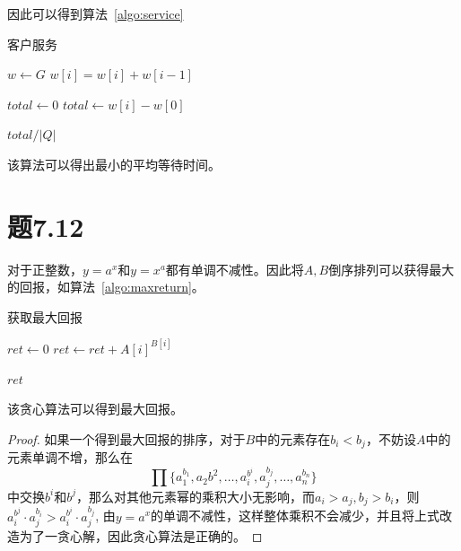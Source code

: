 \documentclass[a4paper,twoside]{article}
\begin{document}
\begin{spacing}{1.2}
因此可以得到算法~\ref{algo:service}

\begin{algorithm}
	\caption{客户服务}
	\label{algo:service}
	\begin{algorithmic}[1]
		
		
		\State {}

		\State $w \gets G$
		\State $w[i]=w[i]+w[i-1]$
		\EndFor

		\State $total\gets 0$
		\State $total\gets w[i]-w[0]$
		\EndFor
		

		\State \Return $total/|Q|$
		
		\EndProcedure
	\end{algorithmic}
\end{algorithm}	

该算法可以得出最小的平均等待时间。

\section{题7.12}

对于正整数，$y=a^x$和$y=x^a$都有单调不减性。因此将$A,B$倒序排列可以获得最大的回报，如算法~\ref{algo:maxreturn}。

\begin{algorithm}[H]
	\caption{获取最大回报}
	\label{algo:maxreturn}
	\begin{algorithmic}[1]
		
		
		\State {}
		
		\State $ret \gets 0$
			\State $ret \gets ret + A[i]^{B[i]}$
		\EndFor

		\State \Return $ret$		
		\EndProcedure
	\end{algorithmic}
\end{algorithm}	

该贪心算法可以得到最大回报。

\begin{proof}
	如果一个得到最大回报的排序，对于$B$中的元素存在$b_i<b_j$，不妨设$A$中的元素单调不增，那么在
	\[
		\prod\{a_1^{b_1},a_2{b^2},\ldots,a_i^{b^i},a_j^{b_j},\ldots,a_n^{b_n}\}
	\]
	中交换$b^i$和$b^j$，那么对其他元素幂的乘积大小无影响，而$a_i>a_j,b_j>b_i$，则$a_i^{b^j}\cdot a_j^{b_i}>a_i^{b^i}\cdot a_j^{b_j}$,
	由$y=a^x$的单调不减性，这样整体乘积不会减少，并且将上式改造为了一贪心解，因此贪心算法是正确的。
\end{proof}


\end{spacing}
\end{document}
